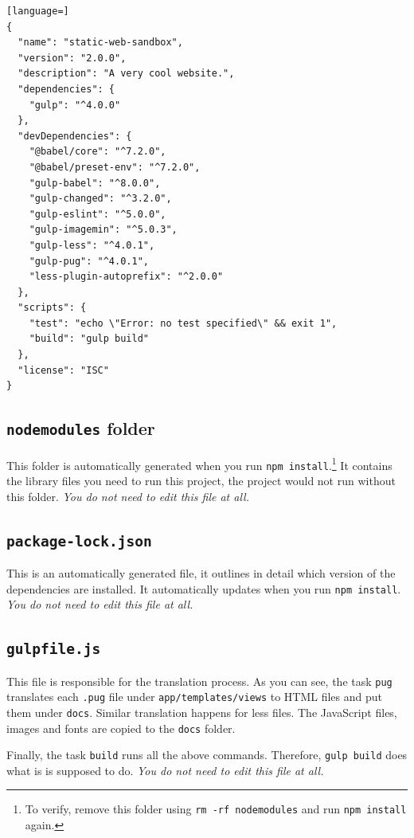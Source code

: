 \begin{lstlisting}[language=]
{
  "name": "static-web-sandbox",
  "version": "2.0.0",
  "description": "A very cool website.",
  "dependencies": {
    "gulp": "^4.0.0"
  },
  "devDependencies": {
    "@babel/core": "^7.2.0",
    "@babel/preset-env": "^7.2.0",
    "gulp-babel": "^8.0.0",
    "gulp-changed": "^3.2.0",
    "gulp-eslint": "^5.0.0",
    "gulp-imagemin": "^5.0.3",
    "gulp-less": "^4.0.1",
    "gulp-pug": "^4.0.1",
    "less-plugin-autoprefix": "^2.0.0"
  },
  "scripts": {
    "test": "echo \"Error: no test specified\" && exit 1",
    "build": "gulp build"
  },
  "license": "ISC"
}
\end{lstlisting}

\subsection{\texttt{node\textunderscore modules} folder}

This folder is automatically generated when you run \texttt{npm install}.\footnote{To verify, remove this folder using \texttt{rm -rf node\textunderscore modules} and run \texttt{npm install} again.} It contains the library files you need to run this project, the project would not run without this folder. \textit{You do not need to edit this file at all.}

\subsection{\texttt{package-lock.json}}

This is an automatically generated file, it outlines in detail which version of the dependencies are installed. It automatically updates when you run \texttt{npm install}. \textit{You do not need to edit this file at all.}

\subsection{\texttt{gulpfile.js}}
\label{sec:gulpfile}

This file is responsible for the translation process. As you can see, the task \texttt{pug} translates each \texttt{.pug} file under \texttt{app/templates/views} to HTML files and put them under \texttt{docs}. Similar translation happens for less files. The JavaScript files, images and fonts are copied to the \texttt{docs} folder.

Finally, the task \texttt{build} runs all the above commands. Therefore, \texttt{gulp build} does what is is supposed to do. \textit{You do not need to edit this file at all.}

